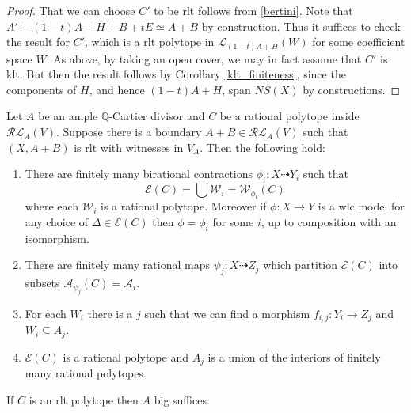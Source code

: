 \documentclass[a4paper,12pt]{amsart}
\begin{document}
\begin{proof}
		That we can choose $C'$ to be rlt follows from \autoref{bertini}. Note that $A'+(1-t)A+H+B+tE \simeq A+B$ by construction. Thus it suffices to check the result for $C'$, which is a rlt polytope in $\mathcal{L}_{(1-t)A+H}(W)$ for some coefficient space $W$. As above, by taking an open cover, we may in fact assume that $C'$ is klt. But then the result follows by Corollary \ref{klt_finiteness}, since the components of $H$, and hence $(1-t)A+H$, span $NS(X)$ by constructions.	

	\end{proof}


	
	\begin{theorem}\label{rltfiniteness}
		Let $A$ be an ample $\mathbb{Q}$-Cartier divisor and $C$ be a rational polytope inside $\mathcal{RL}_{A}(V)$. Suppose there is a boundary $A+B \in \mathcal{RL}_{A}(V)$ such that $(X,A+B)$ is rlt with witnesses in $V_{A}$. Then the following hold:
		
		\begin{enumerate}
			\item There are finitely many birational contractions $\phi_{i}:X \dashrightarrow Y_{i}$ such that 
			\[\mathcal{E}(C) = \bigcup \mathcal{W}_{i}=\mathcal{W}_{\phi_{i}}(C)\]
			where each $\mathcal{W}_{i}$ is a rational polytope. Moreover if $\phi:X \to Y$ is a wlc model for any choice of $\Delta \in \mathcal{E}(C)$ then $\phi=\phi_{i}$ for some $i$, up to composition with an isomorphism.
			
			\item There are finitely many rational maps $\psi_{j}:X \dashrightarrow Z_{j}$ which partition $\mathcal{E}(C)$ into subsets $\mathcal{A}_{\psi_{j}}(C)=\mathcal{A}_{i}$.
			\item  For each $W_{i}$ there is a $j$ such that we can find a morphism $f_{i,j}: Y_{i} \to Z_{j}$ and $W_{i} \subseteq \overline{A_{j}}$.
			\item  $\mathcal{E}(C)$ is a rational polytope and $A_{j}$ is a union of the interiors of finitely many rational polytopes.
		\end{enumerate}
	
	If $C$ is an rlt polytope then $A$ big suffices.
	\end{theorem}
	
\end{document}
